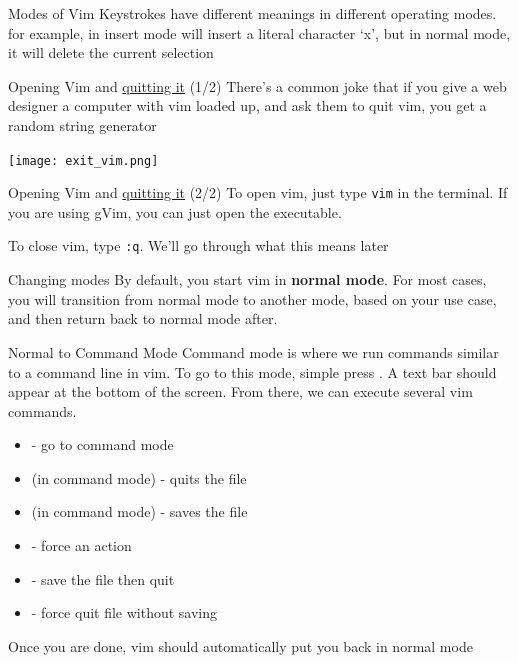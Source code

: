 \documentclass[12pt]{beamer}
\begin{document}
\begin{frame}{Modes of Vim}
    Keystrokes have different meanings in different operating modes. for example,  in insert mode will insert a literal character ‘x’, but in normal mode, it will delete the current selection
\end{frame}{}

\begin{frame}{Opening Vim and \underline{quitting it} (1/2)}
    There's a common joke that if you give a web designer a computer with vim loaded up, and ask them to quit vim,
    you get a random string generator

    \texttt{[image: exit\_vim.png]}
\end{frame}

\begin{frame}{Opening Vim and \underline{quitting it} (2/2)}
    To open vim, just type \texttt{vim} in the terminal. If you are using gVim, you can just open the executable.

    To close vim, type \texttt{:q}. We'll go through what this means later
\end{frame}{}

\begin{frame}{Changing modes}
    By default, you start vim in \textbf{normal mode}. For most cases, you will transition from normal mode to
    another mode, based on your use case, and then return back to normal mode after.
\end{frame}{}

\begin{frame}{Normal to Command Mode}
    Command mode is where we run commands similar to a command line in vim.
    To go to this mode, simple press \keys{:}. A text bar should appear at the bottom of the screen. From there,
    we can execute several vim commands.
    \begin{itemize}
        \item \keys{:} - go to command mode
        \item {} (in command mode) - quits the file
        \item {} (in command mode) - saves the file
        \item \keys{!} - force an action
        \item {} - save the file then quit
        \item {} - force quit file without saving
    \end{itemize}{}
    Once you are done, vim should automatically put you back in normal mode
\end{frame}{}
\end{document}
